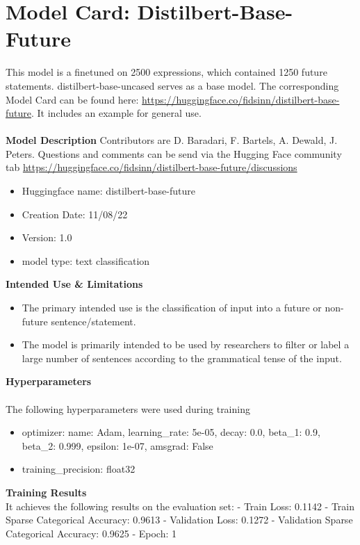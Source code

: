 \section{Model Card: Distilbert-Base-Future}
This model is a finetuned on 2500 expressions, which contained 1250 future statements. distilbert-base-uncased serves as a base model.
The corresponding Model Card can be found here: \url{https://huggingface.co/fidsinn/distilbert-base-future}.
It includes an example for general use.
\\
\\
%
\textbf{Model Description}
Contributors are D. Baradari, F. Bartels, A. Dewald, J. Peters.
Questions and comments can be send via the Hugging Face community tab \url{https://huggingface.co/fidsinn/distilbert-base-future/discussions}
%
\begin{itemize}
    \item Huggingface name: distilbert-base-future
    \item Creation Date: 11/08/22
    \item Version: 1.0
    \item model type: text classification
\end{itemize}%
%
\textbf{Intended Use \& Limitations}
%
\begin{itemize}
    \item The primary intended use is the classification of input into a future or non-future sentence/statement.
    \item The model is primarily intended to be used by researchers to filter or label a large number of sentences according to the grammatical tense of the input.
\end{itemize}%
%
\textbf{Hyperparameters}
\\
\\
The following hyperparameters were used during training
\begin{itemize}
    \item optimizer:
    name: Adam, learning\_rate: 5e-05, decay: 0.0, beta\_1: 0.9, beta\_2: 0.999, epsilon: 1e-07, amsgrad: False
    \item training\_precision: float32
\end{itemize}%
\label{sec:appendix}
%
\textbf{Training Results}
\\
It achieves the following results on the evaluation set:
- Train Loss: 0.1142
- Train Sparse Categorical Accuracy: 0.9613
- Validation Loss: 0.1272
- Validation Sparse Categorical Accuracy: 0.9625
- Epoch: 1
\\
